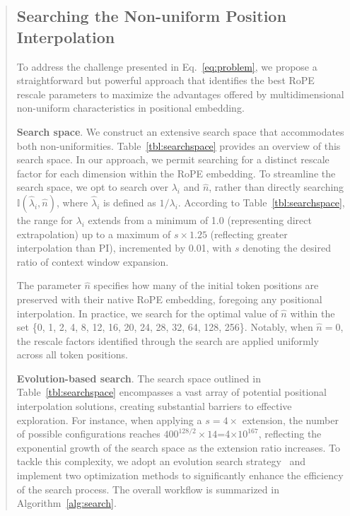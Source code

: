 \begin{abstract}
\subsection{Searching the Non-uniform Position Interpolation}

To address the challenge presented in Eq.~\ref{eq:problem}, we propose a straightforward but powerful approach that identifies the best RoPE rescale parameters to maximize the advantages offered by multidimensional non-uniform characteristics in positional embedding.

\textbf{Search space}. We construct an extensive search space that accommodates both non-uniformities. Table~\ref{tbl:searchspace} provides an overview of this search space. In our approach, we permit searching for a distinct rescale factor for each dimension within the RoPE embedding. To streamline the search space, we opt to search over $\lambda_i$ and $\hat{n}$, rather than directly searching $\mathbb{I}(\hat{\lambda}_{i},\hat{n})$, where $\hat{\lambda}_{i}$ is defined as $1/\lambda_i$. 
According to Table~\ref{tbl:searchspace}, the range for $\lambda_i$ extends from a minimum of 1.0 (representing direct extrapolation) up to a maximum of $s\times1.25$ (reflecting greater interpolation than PI), incremented by 0.01, with $s$ denoting the desired ratio of context window expansion.

The parameter $\hat{n}$ specifies how many of the initial token positions are preserved with their native RoPE embedding, foregoing any positional interpolation. In practice, we search for the optimal value of $\hat{n}$ within the set \{0, 1, 2, 4, 8, 12, 16, 20, 24, 28, 32, 64, 128, 256\}. Notably, when $\hat{n}=0$, the rescale factors identified through the search are applied uniformly across all token positions.

\textbf{Evolution-based search}. The search space outlined in Table~\ref{tbl:searchspace} encompasses a vast array of potential positional interpolation solutions, creating substantial barriers to effective exploration. For instance, when applying a $s=4\times$ extension, the number of possible configurations reaches $400^{128/2}\times14$=4$\times10^{167}$, reflecting the exponential growth of the search space as the extension ratio increases. To tackle this complexity, we adopt an evolution search strategy~\cite{guo2020single} and implement two optimization methods to significantly enhance the efficiency of the search process. The overall workflow is summarized in Algorithm~\ref{alg:search}.


\end{abstract}
